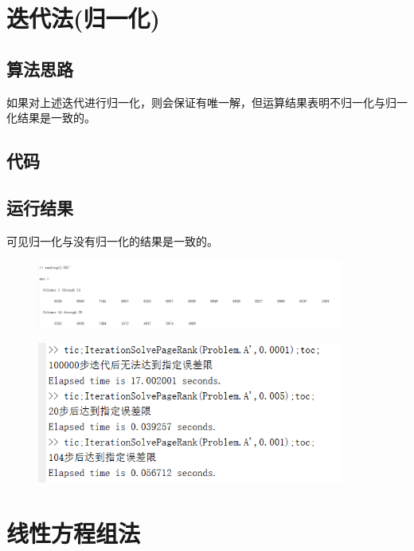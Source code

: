 \documentclass[a4paper,left=2.5cm,right=2.5cm]{article}
\begin{document}
\begin{spacing}{1.6}
	\section{迭代法(归一化)}
	
	\subsection{算法思路}
	如果对上述迭代进行归一化，则会保证有唯一解，但运算结果表明不归一化与归一化结果是一致的。
	\subsection{代码}
	
	\subsection{运行结果}
	可见归一化与没有归一化的结果是一致的。
	\begin{figure}[H]
		\includegraphics[width=0.9\textwidth]{image/result_ISP2.png}
	\end{figure}
	\begin{figure}[H]
		\includegraphics[width=0.9\textwidth]{image/result_ISP3.png}
	\end{figure}
	\section{线性方程组法}

\end{spacing}
\end{document}
